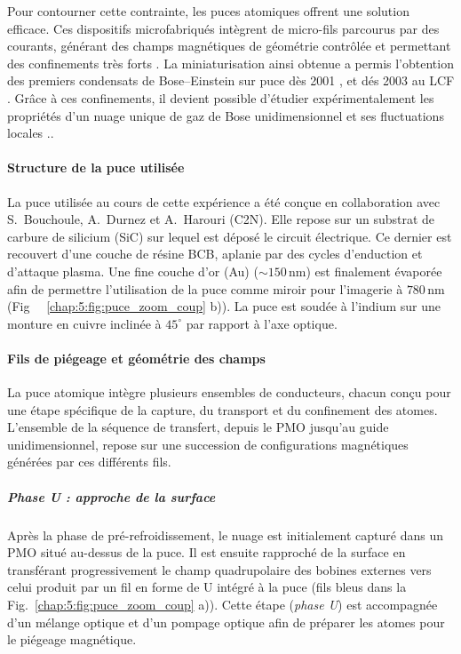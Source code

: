 Pour contourner cette contrainte, les puces atomiques offrent une solution efficace. Ces dispositifs microfabriqués intègrent de micro-fils parcourus par des courants, générant des champs magnétiques de géométrie contrôlée et permettant des confinements très forts \cite{Denschlag1999,Fortagh1998,Folman2000,Reichel1999}. La miniaturisation ainsi obtenue a permis l’obtention des premiers condensats de Bose–Einstein sur puce dès 2001 \cite{Haensel2001,Ott2001}, et dés 2003 au \gls{LCF} \cite{Aussibal2003}. Grâce à ces confinements, il devient possible d’étudier expérimentalement les propriétés d’un nuage unique de gaz de Bose unidimensionnel et ses fluctuations locales \cite{Schumm2005,Trebbia2006}..


\paragraph{Structure de la puce utilisée}
La puce utilisée au cours de cette expérience a été conçue en collaboration avec S.~Bouchoule, A.~Durnez et A.~Harouri (\gls{C2N}). Elle repose sur un substrat de carbure de silicium (\gls{SiC}) sur lequel est déposé le circuit électrique. Ce dernier est recouvert d’une couche de résine \gls{BCB}, aplanie par des cycles d’enduction et d’attaque plasma. Une fine couche d’or (\gls{Au}) (\(\sim 150\,\mathrm{nm}\)) est finalement évaporée afin de permettre l’utilisation de la puce comme miroir pour l’imagerie à \(780\,\mathrm{nm}\) (Fig ~ \ref{chap:5:fig:puce_zoom_coup} b)). La puce est soudée à l’indium sur une monture en cuivre inclinée à \(45^\circ\) par rapport à l’axe optique.


\paragraph{Fils de piégeage et géométrie des champs}
La puce atomique intègre plusieurs ensembles de conducteurs, chacun conçu pour une étape spécifique de la capture, du transport et du confinement des atomes. L’ensemble de la séquence de transfert, depuis le \gls{PMO} jusqu’au guide unidimensionnel, repose sur une succession de configurations magnétiques générées par ces différents fils.


\subparagraph{Phase U : approche de la surface}
Après la phase de pré-refroidissement, le nuage est initialement capturé dans un \gls{PMO} situé au-dessus de la puce. Il est ensuite rapproché de la surface en transférant progressivement le champ quadrupolaire des bobines externes vers celui produit par un fil en forme de U intégré à la puce (fils bleus dans la Fig.~\ref{chap:5:fig:puce_zoom_coup} a)). Cette étape (\textit{phase U}) est accompagnée d’un mélange optique et d’un pompage optique afin de préparer les atomes pour le piégeage magnétique.

